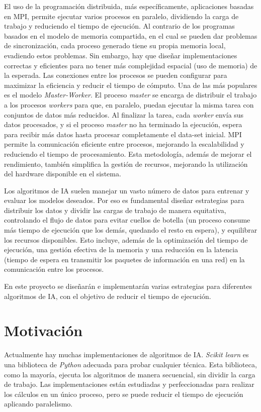 	El uso de la programación distribuida, más específicamente, aplicaciones basadas en MPI, permite ejecutar varios procesos en paralelo, dividiendo la carga de trabajo y reduciendo el tiempo de ejecución. Al contrario de los programas basados en el modelo de memoria compartida, en el cual se pueden dar problemas de sincronización, cada proceso generado tiene su propia memoria local, evadiendo estos problemas. Sin embargo, hay que diseñar implementaciones correctas y eficientes para no tener más complejidad espacial (uso de memoria) de la esperada. Las conexiones entre los procesos se pueden configurar para maximizar la eficiencia y reducir el tiempo de cómputo. Una de las más populares es el modelo \textit{Master-Worker}. El proceso \textit{master} se encarga de distribuir el trabajo a los procesos \textit{workers} para que, en paralelo, puedan ejecutar la misma tarea con conjuntos de datos más reducidos. Al finalizar la tarea, cada \textit{worker} envía sus datos procesados, y si el proceso \textit{master} no ha terminado la ejecución, espera para recibir más datos hasta procesar completamente el data-set inicial. MPI permite la comunicación eficiente entre procesos, mejorando la escalabilidad y reduciendo el tiempo de procesamiento. Esta metodología, además de mejorar el rendimiento, también simplifica la gestión de recursos, mejorando la utilización del hardware disponible en el sistema. 
	
	Los algoritmos de IA suelen manejar un vasto número de datos para entrenar y evaluar los modelos deseados. Por eso es fundamental diseñar estrategias para distribuir los datos y dividir las cargas de trabajo de manera equitativa, controlando el flujo de datos para evitar cuellos de botella (un proceso consume más tiempo de ejecución que los demás, quedando el resto en espera), y equilibrar los recursos disponibles. Esto incluye, además de la optimización del tiempo de ejecución, una gestión efectiva de la memoria y una reducción en la latencia (tiempo de espera en transmitir los paquetes de información en una red) en la comunicación entre los procesos. 
	
	En este proyecto se diseñarán e implementarán varias estrategias para diferentes algoritmos de IA, con el objetivo de reducir el tiempo de ejecución.





\section{Motivación}
	Actualmente hay muchas implementaciones de algoritmos de IA. \textit{Scikit learn} es una biblioteca de \textit{Python} adecuada para probar cualquier técnica. Esta biblioteca, como la mayoría, ejecuta los algoritmos de manera secuencial, sin dividir la carga de trabajo. Las implementaciones están estudiadas y perfeccionadas para realizar los cálculos en un único proceso, pero se puede reducir el tiempo de ejecución aplicando paralelismo. 
	
